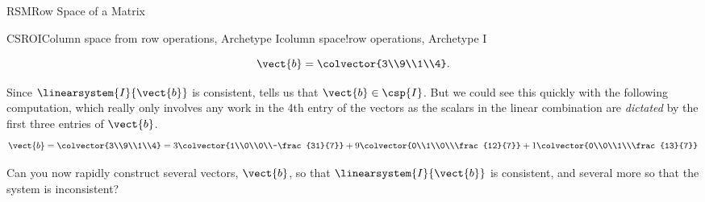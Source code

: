 \begin{subsect}{RSM}{Row Space of a Matrix}
\begin{example}{CSROI}{Column space from row operations, Archetype I}{column space!row operations, Archetype I}
\begin{para}
%
\begin{equation*}
\vect{b}=\colvector{3\\9\\1\\4}.
\end{equation*}
\end{para}
%
\begin{para}Since $\linearsystem{I}{\vect{b}}$ is consistent,  tells us that $\vect{b}\in\csp{I}$.  But we could see this quickly with the following computation, which really only involves any work in the 4th entry of the vectors as the scalars in the linear combination are {\em dictated} by the first three entries of $\vect{b}$.
%
\begin{equation*}
\vect{b}=\colvector{3\\9\\1\\4}=
3\colvector{1\\0\\0\\-\frac{31}{7}}+
9\colvector{0\\1\\0\\\frac{12}{7}}+
1\colvector{0\\0\\1\\\frac{13}{7}}
\end{equation*}
\end{para}
%
\begin{para}Can you now rapidly construct several vectors, $\vect{b}$, so that $\linearsystem{I}{\vect{b}}$ is consistent, and several more so that the system is inconsistent?\end{para}
%
\end{example}
%
%
\end{subsect}
%
